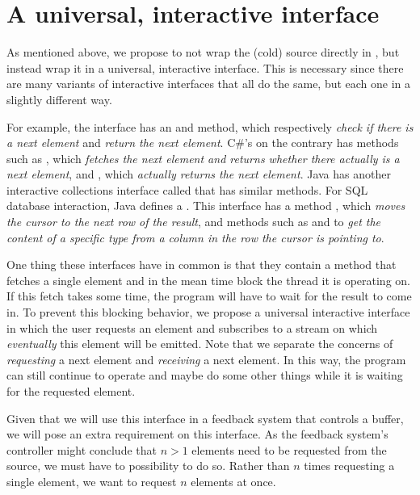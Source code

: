 \section{A universal, interactive interface}
As mentioned above, we propose to not wrap the (cold) source directly in , but instead wrap it in a universal, interactive interface. This is necessary since there are many variants of interactive interfaces that all do the same, but each one in a slightly different way.

For example, the \itr interface has an  and  method, which respectively \textit{check if there is a next element} and \textit{return the next element}. C\#'s \ier on the contrary has methods such as , which \textit{fetches the next element and returns whether there actually is a next element}, and , which \textit{actually returns the next element}. Java has another interactive collections interface called  that has similar methods. For SQL database interaction, Java defines a . This interface has a method , which \textit{moves the cursor to the next row of the result}, and methods such as  and  to \textit{get the content of a specific type from a column in the row the cursor is pointing to}.

One thing these interfaces have in common is that they contain a method that fetches a single element and in the mean time block the thread it is operating on. If this fetch takes some time, the program will have to wait for the result to come in. To prevent this blocking behavior, we propose a universal interactive interface in which the user requests an element and subscribes to a stream on which \textit{eventually} this element will be emitted. Note that we separate the concerns of \textit{requesting} a next element and \textit{receiving} a next element. In this way, the program can still continue to operate and maybe do some other things while it is waiting for the requested element.

Given that we will use this interface in a feedback system that controls a buffer, we will pose an extra requirement on this interface. As the feedback system's controller might conclude that $n > 1$ elements need to be requested from the source, we must have to possibility to do so. Rather than $n$ times requesting a single element, we want to request $n$ elements at once.

